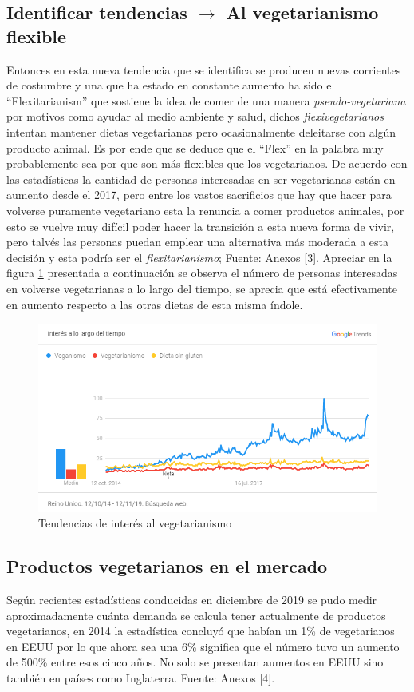 \documentclass{article}
\begin{document}
\subsection{Identificar tendencias $\rightarrow$  Al vegetarianismo flexible}
Entonces en esta nueva tendencia que se identifica se producen nuevas corrientes de costumbre y una que ha estado en constante aumento ha sido el ``Flexitarianism'' que sostiene la idea de comer de una manera \emph{pseudo-vegetariana} por motivos como ayudar al medio ambiente y salud, dichos \emph{flexivegetarianos} intentan mantener dietas vegetarianas pero ocasionalmente deleitarse con algún producto animal. Es por ende que se deduce que el ``Flex'' en la palabra muy probablemente sea por que son más flexibles que los vegetarianos. De acuerdo con las estadísticas la cantidad de personas interesadas en ser vegetarianas están en aumento desde el 2017, pero entre los vastos sacrificios que hay que hacer para volverse puramente vegetariano esta la renuncia a comer productos animales, por esto se vuelve muy difícil poder hacer la transición a esta nueva forma de vivir, pero talvés las personas puedan emplear una alternativa más moderada a esta decisión y esta podría ser el \emph{flexitarianismo}; Fuente: Anexos [3].  Apreciar en la figura \ref{veg} presentada a continuación se observa el número de personas interesadas en volverse vegetarianas a lo largo del tiempo, se aprecia que está efectivamente en aumento respecto a las otras dietas de esta misma índole.  
\begin{figure}[htbp]
    \centering
    \includegraphics[width=12cm]{./TendenciasVegetarianas.png}
    \caption{Tendencias de interés al vegetarianismo}
    \label{veg}
\end{figure}

\subsection{Productos vegetarianos en el mercado}
Según recientes estadísticas conducidas en diciembre de 2019 se pudo medir aproximadamente cuánta demanda se calcula tener actualmente de productos vegetarianos, en 2014 la estadística concluyó que habían un 1\% de vegetarianos en EEUU por lo que ahora sea una 6\% significa que el número tuvo un aumento de 500\% entre esos cinco años. No solo se presentan aumentos en EEUU sino también en países como Inglaterra. Fuente: Anexos [4].
\end{document}
